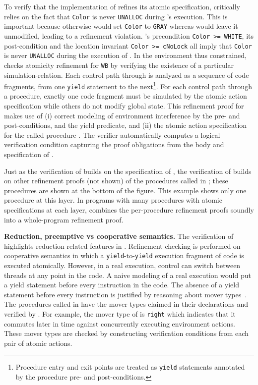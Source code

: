 To verify that the implementation of  refines its atomic specification, \civl critically relies on the fact that {\tt Color} is never {\tt UNALLOC} during 's execution. 
This is important because otherwise  would set {\tt Color} to {\tt GRAY} whereas  would leave it unmodified, leading to a refinement violation. 
's precondition {\tt Color >=  WHITE}, its post-condition and the location invariant {\tt Color >= cNoLock} all imply that {\tt Color} is never {\tt UNALLOC} during the execution of . 
In the environment thus constrained, \civl checks atomicity refinement for {\tt WB} by verifying the existence of a particular simulation-relation. 
Each control path through  is analyzed as a sequence of code fragments, from one {\tt yield} statement to the next\footnote{Procedure entry and exit points are treated as {\tt yield} statements annotated by the procedure pre- and post-conditions.}.
For each control path through a procedure, exactly one code fragment must be simulated by the atomic action specification while others do not modify global state.
This refinement proof for  makes use of (i) correct modeling of environment interference by the pre- and post-conditions, and the yield predicate, and (ii) the atomic action specification for the called procedure . 
The \civl verifier automatically computes a logical verification condition capturing the proof obligations from the body and specification of .

Just as the verification of  builds on the specification of , the verification of  builds on other refinement proofs (not shown) of the procedures called in ; these procedures are shown at the bottom of the figure. 
This example shows only one procedure at this layer. In programs with many procedures with atomic specifications at each layer, \civl combines the per-procedure refinement proofs soundly into a whole-program refinement proof. 

{\bf Reduction, preemptive vs cooperative semantics.}
The verification of  highlights reduction-related features
in \civl. 
Refinement checking is performed on cooperative semantics in which a 
{\tt yield}-to-{\tt yield} execution fragment of code is executed atomically.
However, in a real execution, control can switch between threads at any point in the code. 
A naive modeling of a real execution would put a yield statement before every instruction in the code.
The absence of a yield statement before every instruction is justified by reasoning about mover types~\cite{FlanaganFLQ08}. 
The procedures called in  have the mover types claimed in their
declarations and verified by \civl. 
For example, the mover type of  is {\tt right} which indicates 
that it commutes later in time against concurrently executing
environment actions. 
These mover types are checked by constructing verification conditions from each pair of atomic actions.

